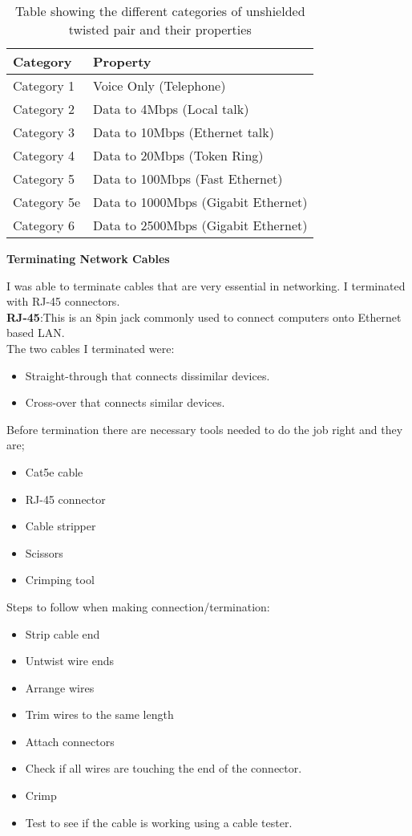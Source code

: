 \documentclass{article}
\begin{document}
\begin{table}[H]
\centering
\begin{tabu} to 0.8\textwidth { | X[c] | X[c] | }
 \hline
 \textbf{Category} & \textbf{Property}\\
 \hline
 Category 1 & Voice Only (Telephone)\\
\hline
 Category 2& Data to 4Mbps (Local talk) \\
\hline
 Category 3 & Data to 10Mbps (Ethernet talk)\\
\hline
 Category 4 & Data to 20Mbps (Token Ring)\\
\hline
 Category 5 & Data to 100Mbps (Fast Ethernet)\\
\hline
 Category 5e & Data to 1000Mbps (Gigabit Ethernet)\\
\hline
 Category 6 & Data to 2500Mbps (Gigabit Ethernet)\\
\hline
\end{tabu}
\caption{Table showing the different categories of unshielded twisted pair and their properties}
\label{table:2}
\end{table}
\textbf{Terminating Network Cables}
\par I was able to terminate cables that are very essential in networking. I terminated with RJ-45 connectors. \\
\textbf{RJ-45}:This is an 8pin jack commonly used to connect computers onto Ethernet based LAN.\\
The two cables I terminated were:
\begin{itemize}
\item Straight-through that connects dissimilar devices.
\item Cross-over that connects similar devices.
\end{itemize}
Before termination there are necessary tools needed to do the job right and they are;
\begin{itemize}
\item Cat5e cable
\item RJ-45 connector
\item Cable stripper
\item Scissors
\item Crimping tool
\end{itemize}
Steps to follow when making connection/termination:
\begin{itemize}
\item Strip cable end
\item Untwist wire ends
\item  Arrange wires
\item  Trim wires to the same length
\item  Attach connectors
\item  Check if all wires are touching the end of the connector.
\item  Crimp
\item  Test to see if the cable is working using a cable tester.
\end{itemize}
\end{document}
